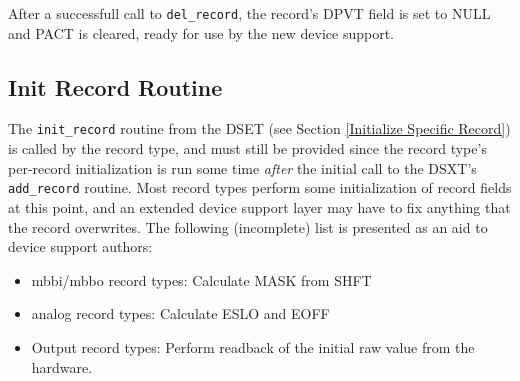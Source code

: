 After a successfull call to \verb|del_record|, the record's DPVT field is set to NULL and PACT is cleared, ready for use by 
the new device support.

\subsection{Init Record Routine}

The \verb|init_record| routine from the DSET (see Section \ref{Initialize Specific Record}) is called by the record type, and must still be 
provided since the record type's per-record initialization is run some time \emph{after} the initial call to the DSXT's 
\verb|add_record| routine. Most record types perform some initialization of record fields at this point, and an extended device 
support layer may have to fix anything that the record overwrites. The following (incomplete) list is presented as an aid to 
device support authors:

\begin{itemize}
\item mbbi/mbbo record types: Calculate MASK from SHFT

\item analog record types: Calculate ESLO and EOFF

\item Output record types: Perform readback of the initial raw value from the hardware.

\end{itemize}








